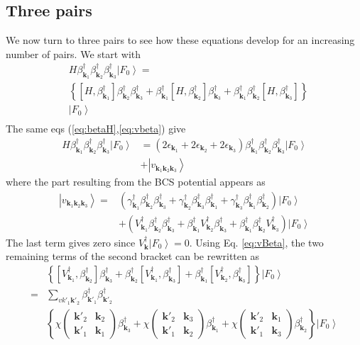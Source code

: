 \documentclass[aps,prb,amsmath,amssymb,superscriptaddress,twocolumn]{revtex4-1}
\newcommand{\vk}{\ensuremath{\mathbf{k}}}
\newcommand{\ket}[1]{\ensuremath{\left|#1\right>}}
\newcommand{\br}[1]{\ensuremath{\left(#1\right)}}
\newcommand{\mbr}[1]{\ensuremath{\left[#1\right]}}
\newcommand{\bbr}[1]{\ensuremath{\left\{#1\right\}}}
\newcommand{\fmtrx}[4]{\ensuremath{\br{\begin{smallmatrix}#1&#2\\#3&#4\end{smallmatrix}}}}
\newcommand{\com}[2]{\ensuremath{\mbr{#1,#2}}}
\newcommand{\fo}{\ensuremath{\ket{F_0}}}
\begin{document}
\subsection{Three pairs}
We now turn to three pairs to see how these equations develop for an increasing number of pairs. We start with 
\begin{equation}\label{eq:SchThree}
\begin{split}
&H\beta^{\dagger}_{\vk_1}\beta^{\dagger}_{\vk_2}\beta^{\dagger}_{\vk_3}\fo
=\\
&\bbr{\com{H}{\beta^{\dagger}_{\vk_1}}\beta^{\dagger}_{\vk_2}\beta^{\dagger}_{\vk_3}+\beta^{\dagger}_{\vk_1}\com{H}{\beta^{\dagger}_{\vk_2}}\beta^{\dagger}_{\vk_3}+\beta^{\dagger}_{\vk_1}\beta^{\dagger}_{\vk_2}\com{H}{\beta^{\dagger}_{\vk_3}}}\\
&\fo\\
\end{split}
\end{equation}
The same eqs  (\ref{eq:betaH},\ref{eq:vbeta}) give
\begin{equation}\label{eq:SchThree2}
\begin{split}
H\beta^{\dagger}_{\vk_1}\beta^{\dagger}_{\vk_2}\beta^{\dagger}_{\vk_3}\fo
&=\br{2\epsilon_{\vk_1}+2\epsilon_{\vk_2}+2\epsilon_{\vk_3}}\beta^{\dagger}_{\vk_1}\beta^{\dagger}_{\vk_2}\beta^{\dagger}_{\vk_3}\fo\\
&+\ket{v_{\vk_1\vk_2\vk_3}}
\end{split}
\end{equation}
where the part resulting from  the BCS potential appears as 
\begin{equation}\label{eq:vThree}
\begin{split}
\ket{v_{\vk_1\vk_2\vk_3}}=
&\br{\gamma^{\dagger}_{\vk_1}\beta^{\dagger}_{\vk_2}\beta^{\dagger}_{\vk_3}+\gamma^{\dagger}_{\vk_2}\beta^{\dagger}_{\vk_3}\beta^{\dagger}_{\vk_1}+\gamma^{\dagger}_{\vk_3}\beta^{\dagger}_{\vk_1}\beta^{\dagger}_{\vk_2}}\fo\\
&+\br{V^{\dagger}_{\vk_1}\beta^{\dagger}_{\vk_2}\beta^{\dagger}_{\vk_3}+\beta^{\dagger}_{\vk_1}V^{\dagger}_{\vk_2}\beta^{\dagger}_{\vk_3}+\beta^{\dagger}_{\vk_1}\beta^{\dagger}_{\vk_2}V^{\dagger}_{\vk_3}}\fo
\end{split}
\end{equation}
The last term  gives zero since $V^{\dagger}_\vk\fo=0$.  Using Eq. \eqref{eq:vBeta}, the two remaining terms of the second bracket can be rewritten as 
\begin{equation}\label{eq:vThree2}
\begin{split}
&\bbr{\com{V^{\dagger}_{\vk_1}}{\beta^{\dagger}_{\vk_2}}\beta^{\dagger}_{\vk_3}+\beta^{\dagger}_{\vk_2}\com{V^{\dagger}_{\vk_1}}{\beta^{\dagger}_{\vk_3}}+\beta^{\dagger}_{\vk_1}\com{V^{\dagger}_{\vk_2}}{\beta^{\dagger}_{\vk_3}}}\fo\\
=&\sum_{vk'_1\vk'_2}\beta^{\dagger}_{\vk'_1}\beta^{\dagger}_{\vk'_2}\\
&\bbr{\chi\fmtrx{\vk'_2}{\vk_2}{\vk'_1}{\vk_1}\beta^{\dagger}_{\vk_3}+\chi\fmtrx{\vk'_2}{\vk_3}{\vk'_1}{\vk_2}\beta^{\dagger}_{\vk_1}+\chi\fmtrx{\vk'_2}{\vk_1}{\vk'_1}{\vk_3}\beta^{\dagger}_{\vk_2}}\fo
\end{split}
\end{equation}
\end{document}
